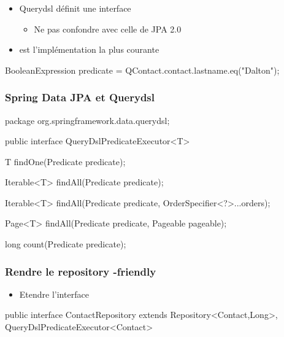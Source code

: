\begin{frame}[fragile]
 \frametitle{}

 \begin{itemize}
  \item Querydsl définit une interface 
  \begin{itemize}
   \item Ne pas confondre avec celle de JPA 2.0
  \end{itemize}
  \item {} est l'implémentation la plus courante
 \end{itemize}

 \begin{javacode}
BooleanExpression predicate = QContact.contact.lastname.eq("Dalton");
 \end{javacode}
\end{frame}

\begin{frame}[fragile]
 \frametitle{Spring Data JPA et Querydsl}

 \begin{javacode}
package org.springframework.data.querydsl;

public interface QueryDslPredicateExecutor<T> {

  T findOne(Predicate predicate);

  Iterable<T> findAll(Predicate predicate);

  Iterable<T> findAll(Predicate predicate, OrderSpecifier<?>...orders);

  Page<T> findAll(Predicate predicate, Pageable pageable);

  long count(Predicate predicate);
}
 \end{javacode}
\end{frame}

\begin{frame}[fragile]
 \frametitle{Rendre le repository -friendly}

 \begin{itemize}
  \item Etendre l'interface 
 \end{itemize}

 \begin{javacode}
public interface ContactRepository 
	    extends Repository<Contact,Long>,
	    QueryDslPredicateExecutor<Contact> {

}
 \end{javacode}

\end{frame}

